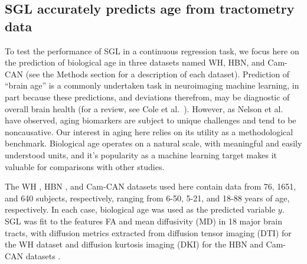 \documentclass[10pt,letterpaper]{article}
\begin{document}
\subsection*{SGL accurately predicts age from tractometry data}

To test the performance of SGL  in a continuous
regression task, we focus here on the prediction of biological age in three
datasets named WH, HBN, and Cam-CAN (see the Methods section for a description of each dataset). Prediction of ``brain
age'' is a commonly undertaken task in neuroimaging machine learning, in part
because these predictions, and deviations therefrom, may be diagnostic of
overall brain health (for a review, see Cole et al.~\cite{Cole2019-rz}).
However, as Nelson et al.~\cite{nelson2019biomarkers} have observed, aging
biomarkers are subject to unique challenges and tend to be noncausative. Our
interest in aging here relies on its utility as a methodological benchmark.
Biological age operates on a natural scale, with meaningful and easily
understood units, and it's popularity as a machine learning target makes it
valuable for comparisons with other studies.

The WH \cite{yeatman2014lifespan}, HBN \cite{alexander2017open}, and Cam-CAN
\cite{shafto2014cambridge,taylor2017cambridge} datasets used here contain
data from 76, 1651, and 640 subjects, respectively, ranging from 6-50, 5-21,
and 18-88 years of age, respectively. In each case, biological age was used
as the predicted variable $y$. SGL was fit to the 
features FA and mean diffusivity (MD) in 18 major brain tracts, with diffusion metrics extracted
from diffusion tensor imaging (DTI) for the WH dataset and diffusion kurtosis
imaging (DKI) \cite{jensen2005diffusion} for the HBN and Cam-CAN datasets .
\end{document}
